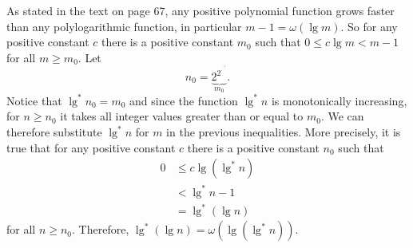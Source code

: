 As stated in the text on page 67, any positive polynomial function grows faster than any polylogarithmic function, in particular $m-1=\omega(\lg m)$.
So for any positive constant $c$ there is a positive constant $m_0$ such that $0\le c\lg m<m-1$ for all $m\ge m_0$.
Let
\[
    n_0 = \underbrace{2^{2^{\cdot^{\cdot^{\cdot^{2}}}}}}_{m_0}.
\]
Notice that $\lg^*n_0=m_0$ and since the function $\lg^*n$ is monotonically increasing, for $n\ge n_0$ it takes all integer values greater than or equal to $m_0$.
We can therefore substitute $\lg^*n$ for $m$ in the previous inequalities.
More precisely, it is true that for any positive constant $c$ there is a positive constant $n_0$ such that
\begin{align*}
    0 &\le c\lg(\lg^*n) \\
    &< \lg^*n-1 \\
    &= \lg^*(\lg n)
\end{align*}
for all $n\ge n_0$.
Therefore, $\lg^*(\lg n)=\omega(\lg(\lg^*n))$.
